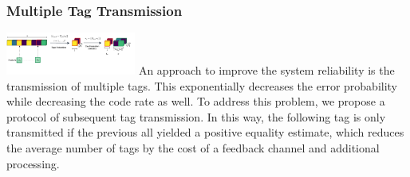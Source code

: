 \documentclass[%
  english,%
  paper=A1,%
  fontsize=22pt,%
  cdfoot=5ex,%
  ddcfoot,%
  BCOR=-20mm,
]{tudscrposter}
\begin{document}
\begin{multicols}{3}
\subsubsection*{Multiple Tag Transmission}
\includegraphics[width=0.32\textwidth]{figures/ID_flow-Multitag.drawio.pdf}
An approach to improve the system reliability is the transmission of multiple tags. This exponentially decreases the error probability while decreasing the code rate as well. To address this problem, we propose a protocol of subsequent tag transmission. In this way, the following tag is only transmitted if the previous all yielded a positive equality estimate, which reduces the average number of tags by the cost of a feedback channel and additional processing.



\end{multicols}
\end{document}
